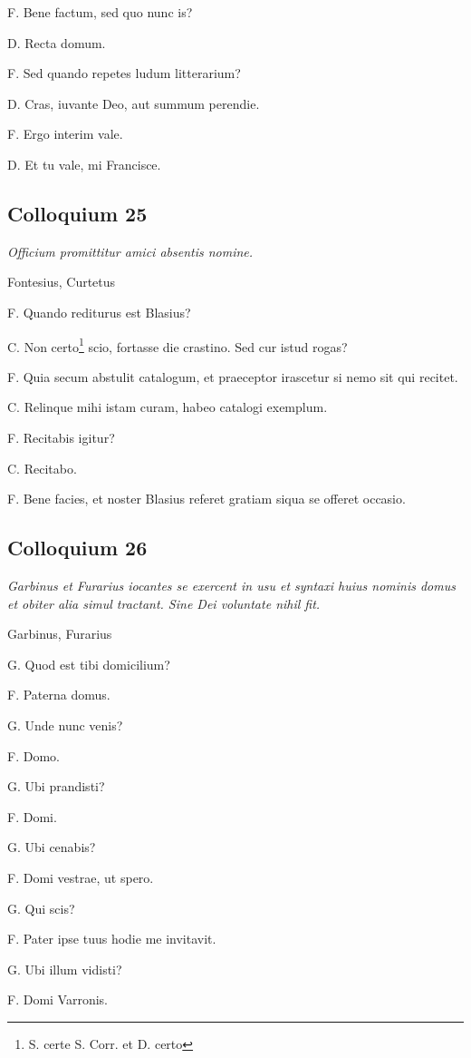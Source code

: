 \documentclass{article}
\begin{document}
 
F. Bene factum, sed quo nunc is?

D. Recta domum. 

F. Sed quando repetes ludum litterarium?

D. Cras, iuvante Deo, aut summum perendie. 

F. Ergo interim vale. 

D. Et tu vale, mi Francisce.

\subsection{Colloquium 25}
\emph{Officium promittitur amici absentis nomine.}

 Fontesius, Curtetus

F. Quando rediturus est Blasius?

C. Non certo\footnote{S. certe S. Corr. et D. certo} scio, fortasse die crastino. Sed cur istud rogas?

F. Quia secum abstulit catalogum, et praeceptor irascetur si nemo sit qui recitet.

C. Relinque mihi istam curam, habeo catalogi exemplum. 

F. Recitabis igitur?

C. Recitabo. 

F. Bene facies, et noster Blasius referet gratiam siqua se offeret occasio. 

\subsection{Colloquium 26}
\emph{Garbinus et Furarius iocantes se exercent in usu et syntaxi huius nominis \emph{domus} et obiter alia simul tractant. Sine Dei voluntate nihil fit.}

Garbinus, Furarius

G. Quod est tibi domicilium?

F. Paterna domus. 

G. Unde nunc venis?

F. Domo. 

G. Ubi prandisti?

F. Domi. 

G. Ubi cenabis?

F. Domi vestrae, ut spero. 

G. Qui scis?

F. Pater ipse tuus hodie me invitavit. 

G. Ubi illum vidisti?

F. Domi Varronis. 
\end{document}
